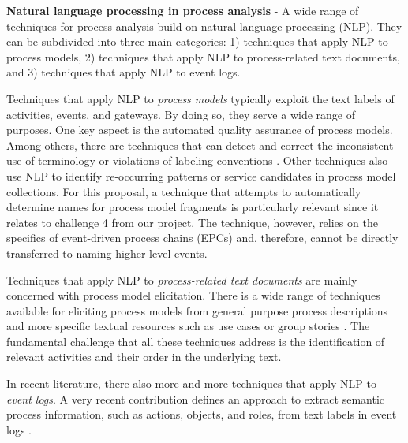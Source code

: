 \textbf{Natural language processing in process analysis} - A wide range of techniques for process analysis build on natural language processing (NLP). They can be subdivided into three main categories: 1) techniques that apply NLP to process models, 2) techniques that apply NLP to process-related text documents, and 3) techniques that apply NLP to event logs.  

Techniques that apply NLP to \textit{process models} typically exploit the text labels of activities, events, and gateways. By doing so, they serve a wide range of purposes. One key aspect is the automated quality assurance of process models. Among others, there are techniques that can detect and correct the inconsistent use of terminology \cite{koschmider2007user,pittke2015automatic} or violations of labeling conventions \cite{becker2009towards,leopold2013detection}. Other techniques also use NLP to identify re-occurring patterns \cite{la2015detecting} or service candidates \cite{leopold2015_jss} in process model collections. For this proposal, a technique that attempts to automatically determine names for process model fragments is particularly relevant \cite{leopold2014simplifying} since it relates to challenge 4 from our project. The technique, however, relies on the specifics of event-driven process chains (EPCs) and, therefore, cannot be directly transferred to naming higher-level events. 

Techniques that apply NLP to \textit{process-related text documents} are mainly concerned with process model elicitation. There is a wide range of techniques available for eliciting process models from general purpose process descriptions \cite{ghose2007process,friedrich2011process,epure2015automatic} and more specific textual resources such as use cases \cite{sinha2010use} or group stories  \cite{de2009business}. The fundamental challenge that all these techniques address is the identification of relevant activities and their order in the underlying text. 

In recent literature, there also more and more techniques that apply NLP to \textit{event logs}. A very recent contribution defines an approach to extract semantic process information, such as actions, objects, and roles, from text labels in event logs \cite{rebmann2021extracting}.


